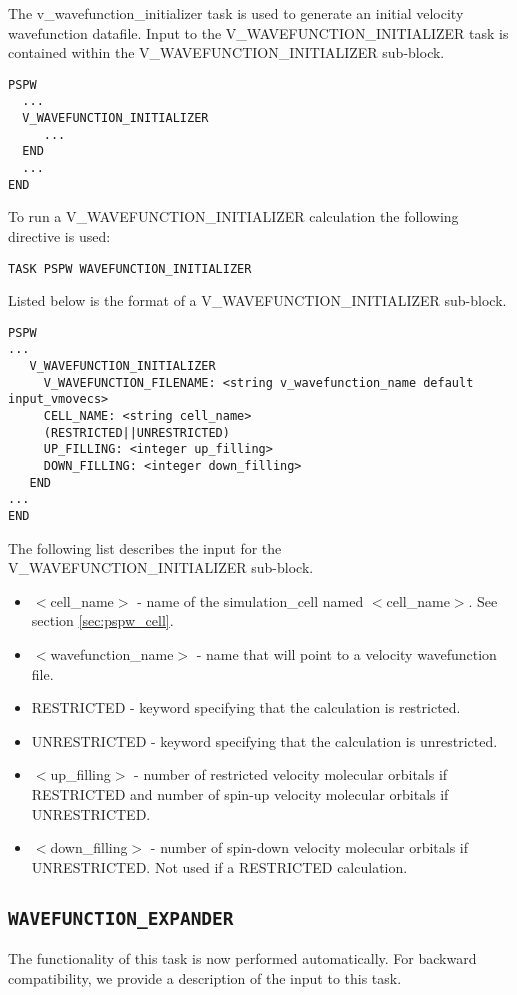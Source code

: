 The v\_wavefunction\_initializer task is used to generate an initial velocity 
wavefunction datafile.
Input to the V\_WAVEFUNCTION\_INITIALIZER task is contained
within the V\_WAVEFUNCTION\_INITIALIZER sub-block.
\begin{verbatim}
PSPW
  ...
  V_WAVEFUNCTION_INITIALIZER
     ...
  END
  ...
END
\end{verbatim}
To run a V\_WAVEFUNCTION\_INITIALIZER calculation the following directive 
is used:
\begin{verbatim}
TASK PSPW WAVEFUNCTION_INITIALIZER
\end{verbatim}
Listed below is the format of a V\_WAVEFUNCTION\_INITIALIZER sub-block.
\begin{verbatim}
PSPW
... 
   V_WAVEFUNCTION_INITIALIZER
     V_WAVEFUNCTION_FILENAME: <string v_wavefunction_name default input_vmovecs>
     CELL_NAME: <string cell_name>
     (RESTRICTED||UNRESTRICTED)
     UP_FILLING: <integer up_filling>
     DOWN_FILLING: <integer down_filling>
   END
...
END
\end{verbatim}
The following list describes the input for the V\_WAVEFUNCTION\_INITIALIZER
sub-block.
\begin{itemize}
        \item $<$cell\_name$>$ - name of the
                simulation\_cell named $<$cell\_name$>$.  See section \ref{sec:pspw_cell}.
        \item $<$wavefunction\_name$>$ - name that will point
              to a velocity wavefunction file.
        \item RESTRICTED - keyword specifying that the calculation is restricted.
        \item UNRESTRICTED - keyword specifying that the calculation is unrestricted.
        \item $<$up\_filling$>$ - number of restricted velocity molecular 
              orbitals if RESTRICTED and number of spin-up velocity molecular 
              orbitals if UNRESTRICTED.
        \item $<$down\_filling$>$ - number of spin-down velocity molecular 
              orbitals if UNRESTRICTED.  Not used if a RESTRICTED calculation.
\end{itemize}



\subsection{\tt WAVEFUNCTION\_EXPANDER}
\label{sec:pspw_wavefunction_expander}
The functionality of this task is now performed automatically. For backward
compatibility, we provide a description of the input to this task.

